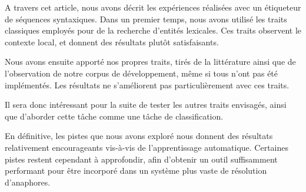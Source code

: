 \documentclass[a4paper,12pt]{article}
\begin{document}
A travers cet article, nous avons décrit les expériences réalisées avec un étiqueteur de séquences syntaxiques. Dans un premier temps, nous avons utilisé les traits classiques employés pour de la recherche d'entités lexicales. Ces traits observent le contexte local, et donnent des résultats plutôt satisfaisants.

Nous avons ensuite apporté nos propres traits, tirés de la littérature ainsi que de l'observation de notre corpus de développement, m\^eme si tous n'ont pas été implémentés. Les résultats ne s'améliorent pas particulièrement avec ces traits.

Il sera donc intéressant pour la suite de tester les autres traits envisagés, ainsi que d'aborder cette tâche comme une tâche de classification.

En définitive, les pistes que nous avons exploré nous donnent des résultats relativement encourageants vis-à-vis de l'apprentissage automatique. Certaines pistes restent cependant à approfondir, afin d'obtenir un outil suffisamment performant pour être incorporé dans un système plus vaste de résolution d'anaphores.



\end{document}
